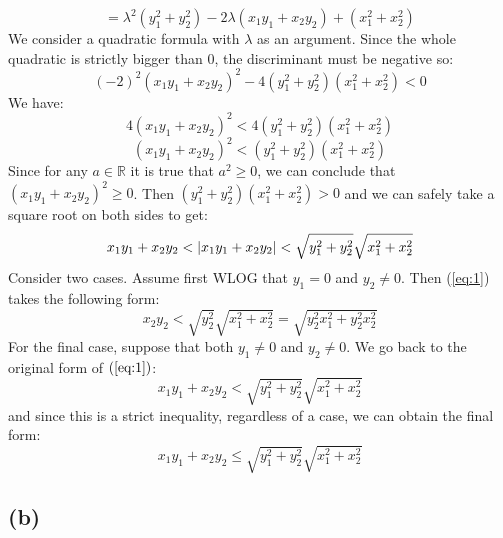 \documentclass{article}
\begin{document}
\begin{equation*}
	= \lambda^{2}(y_{1}^{2} + y_{2}^{2}) - 2 \lambda(x_{1}y_{1} + x_{2}y_{2}) + (x_{1}^{2} + x_{2}^{2})
\end{equation*}
We consider a quadratic formula with \(\lambda\) as an argument.
Since the whole quadratic is strictly bigger than \(0\), the discriminant must be negative so:
\begin{equation*}
	(-2)^{2}(x_{1}y_{1} + x_{2}y_{2})^{2} - 4(y_{1}^{2} + y_{2}^{2})(x_{1}^{2} + x_{2}^{2}) < 0
\end{equation*}
We have:
\begin{equation*}
	4(x_{1}y_{1} + x_{2}y_{2})^{2} < 4(y_{1}^{2} + y_{2}^{2})(x_{1}^{2} + x_{2}^{2})
\end{equation*}
\begin{equation*}
	(x_{1}y_{1} + x_{2}y_{2})^{2} < (y_{1}^{2} + y_{2}^{2})(x_{1}^{2} + x_{2}^{2})
\end{equation*}
Since for any \(a \in \mathbb{R}\) it is true that \(a^{2} \geq 0\), we can conclude that
\((x_{1}y_{1} + x_{2}y_{2})^{2} \geq 0\). Then \((y_{1}^{2} + y_{2}^{2})(x_{1}^{2} + x_{2}^{2}) > 0\)
and we can safely take a square root on both sides to get:
\begin{equation} \label{eq:1}
	x_{1}y_{1} + x_{2}y_{2} < \abs{x_{1}y_{1} + x_{2}y_{2}} < \sqrt{y_{1}^{2} + y_{2}^{2}} \sqrt{x_{1}^{2} + x_{2}^{2}}
\end{equation}
Consider two cases. Assume first WLOG that \(y_{1} = 0\) and \(y_{2} \neq 0\). Then (\ref{eq:1}) takes
the following form:
\begin{equation*}
	x_{2}y_{2} < \sqrt{y_{2}^{2}} \sqrt{x_{1}^{2} + x_{2}^{2}} = \sqrt{y_{2}^{2}x_{1}^{2} + y_{2}^{2}x_{2}^{2}}
\end{equation*}
For the final case, suppose that both \(y_{1} \neq 0\) and \(y_{2} \neq 0\). We go back to the original form of \((\ref{eq:1})\):
\begin{equation*}
	x_{1}y_{1} + x_{2}y_{2} < \sqrt{y_{1}^{2} + y_{2}^{2}} \sqrt{x_{1}^{2} + x_{2}^{2}}
\end{equation*}
and since this is a strict inequality, regardless of a case, we can obtain the final form:
\begin{equation*}
	x_{1}y_{1} + x_{2}y_{2} \leq \sqrt{y_{1}^{2} + y_{2}^{2}} \sqrt{x_{1}^{2} + x_{2}^{2}}
\end{equation*}

\subsection*{(b)}
\end{document}
